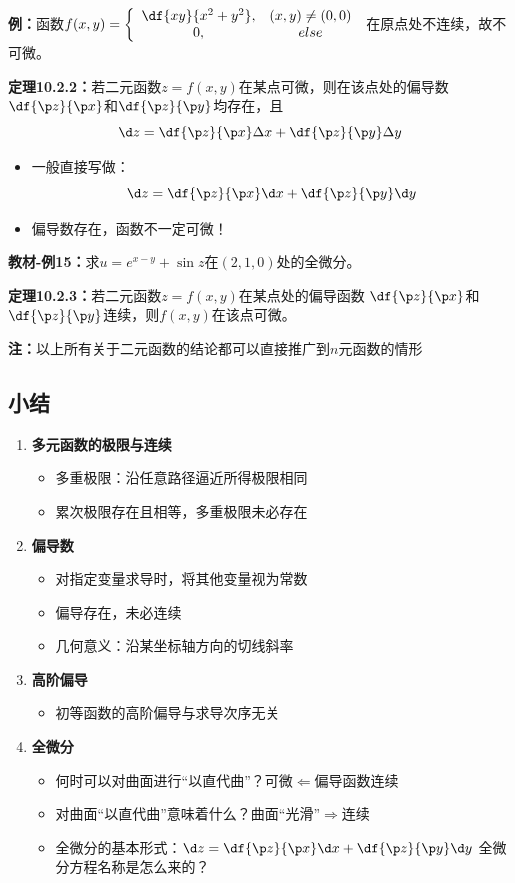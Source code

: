 {\bf 例：}函数$f(x,y)=\left\{\begin{array}{cc}
	\df{xy}{x^2+y^2},& (x,y)\ne (0,0)\\
	0, & else
\end{array}\right.$
在原点处不连续，故不可微。

{\bf 定理10.2.2：}若二元函数$z=f(x,y)$在某点可微，则在该点处的偏导数
$\df{\p z}{\p x}$和$\df{\p z}{\p y}$均存在，且
$$\d z=\df{\p z}{\p x}\Delta x+\df{\p z}{\p y}\Delta y$$

\begin{itemize}
  \item 一般直接写做：
  $${\d z=\df{\p z}{\p x}\d x+\df{\p z}{\p y}\d y}$$ 
  \item 偏导数存在，函数不一定可微！
\end{itemize}

{\bf 教材-例15：}求$u=e^{x-y}+\sin z$在$(2,1,0)$处的全微分。

{\bf 定理10.2.3：}若二元函数$z=f(x,y)$在某点处的偏导函数
$\df{\p z}{\p x}$和$\df{\p z}{\p y}$连续，则$f(x,y)$在该点可微。

{\bf 注：}以上所有关于二元函数的结论都可以直接推广到$n$元函数的情形

\subsection*{小结}

\begin{enumerate}[(1)]
  \setlength{\itemindent}{1cm}
  \item {\bf 多元函数的极限与连续}
  \begin{itemize}
    \item 多重极限：沿任意路径逼近所得极限相同
    \item 累次极限存在且相等，多重极限未必存在
  \end{itemize}
  \item {\bf 偏导数}
  \begin{itemize}
    \item 对指定变量求导时，将其他变量视为常数
    \item 偏导存在，未必连续
    \item 几何意义：沿某坐标轴方向的切线斜率
  \end{itemize}
  \item {\bf 高阶偏导}
  \begin{itemize}
    \item 初等函数的高阶偏导与求导次序无关
  \end{itemize}
  \item {\bf 全微分}
  \begin{itemize}
    \item 何时可以对曲面进行“以直代曲”？\hfill 可微$\Leftarrow$偏导函数连续
    \item 对曲面“以直代曲”意味着什么？\hfill 曲面“光滑”$\Rightarrow$连续
    \item 全微分的基本形式：${\d z=\df{\p z}{\p x}\d x+\df{\p z}{\p y}\d y}$
    \hfill 全微分方程名称是怎么来的？
  \end{itemize}
\end{enumerate}

